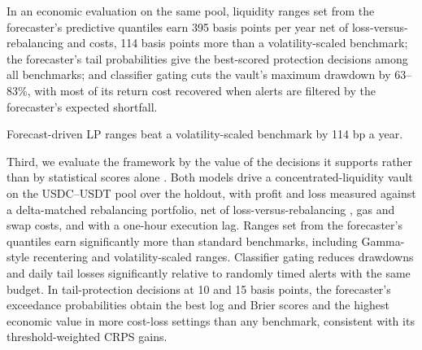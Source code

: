 

In an economic evaluation on the same pool, liquidity ranges set from the forecaster's
predictive quantiles earn 395 basis points per year net of loss-versus-rebalancing and
costs, 114 basis points more than a volatility-scaled benchmark; the forecaster's tail
probabilities give the best-scored protection decisions among all benchmarks; and
classifier gating cuts the vault's maximum drawdown by 63--83\%, with most of its return cost
recovered when alerts are filtered by the forecaster's expected shortfall.


\item Forecast-driven LP ranges beat a volatility-scaled benchmark by 114 bp a year.


Third, we evaluate the framework by the value of the decisions it supports rather than by
statistical scores alone \citep{LeitchTanner1991,GrangerPesaran2000}. Both models drive a
concentrated-liquidity vault on the USDC--USDT pool over the holdout, with profit and loss
measured against a delta-matched rebalancing portfolio, net of loss-versus-rebalancing
\citep{Milionis2022}, gas and swap costs, and with a one-hour execution lag. Ranges set from the
forecaster's quantiles earn significantly more than standard benchmarks, including Gamma-style
recentering and volatility-scaled ranges. Classifier gating reduces drawdowns and daily tail
losses significantly relative to randomly timed alerts with the same budget. In tail-protection
decisions at 10 and 15 basis points, the forecaster's exceedance probabilities obtain the best
log and Brier scores and the highest economic value in more cost-loss settings than any
benchmark, consistent with its threshold-weighted CRPS gains.


